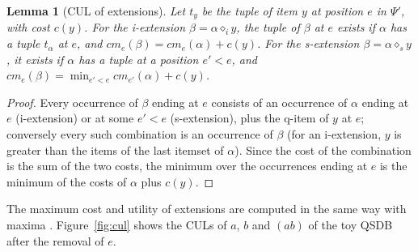 \documentclass[pdflatex,sn-mathphys,Numbered]{sn-jnl}
\theoremstyle{thmstyleone}
\newtheorem{lemma}[theorem]{Lemma}
\theoremstyle{thmstyletwo}
\theoremstyle{thmstylethree}
\begin{document}
\begin{lemma}[CUL of extensions]\label{lem:cul}
Let $t_y$ be the tuple of item $y$ at position $e$ in $\Psi'$, with cost $c(y)$. For the
i-extension $\beta = \alpha \diamond_i y$, the tuple of $\beta$ at $e$ exists if $\alpha$ has a
tuple $t_\alpha$ at $e$, and $\mathit{cm}_e(\beta) = \mathit{cm}_e(\alpha) + c(y)$. For the
s-extension $\beta = \alpha \diamond_s y$, it exists if $\alpha$ has a tuple at a position
$e' < e$, and $\mathit{cm}_e(\beta) = \min_{e' < e} \mathit{cm}_{e'}(\alpha) + c(y)$.
\end{lemma}
\begin{proof}
Every occurrence of $\beta$ ending at $e$ consists of an occurrence of $\alpha$ ending at $e$
(i-extension) or at some $e' < e$ (s-extension), plus the q-item of $y$ at $e$; conversely
every such combination is an occurrence of $\beta$ (for an i-extension, $y$ is greater than the
items of the last itemset of $\alpha$). Since the cost of the combination is the sum of the two
costs, the minimum over the occurrences ending at $e$ is the minimum of the costs of $\alpha$
plus $c(y)$.
\end{proof}

The maximum cost and utility of extensions are computed in the same way with maxima
\cite[Section~5.1.3]{truong2022}. Figure~\ref{fig:cul} shows the CULs of $a$, $b$ and $(ab)$ of
the toy QSDB after the removal of $e$.
\end{document}
